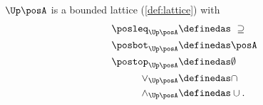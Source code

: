 \begin{lemma}
    \label{lem:u_bounded_lat}
    $\Up \posA$ is a bounded lattice (\cref{def:lattice}) with
    \begin{equation}
        \begin{aligned}
            \posleq_{\Up \posA} & \definedas \ \supseteq \\
            \posbot_{\Up \posA} & \definedas \posA       \\
            \postop_{\Up \posA} & \definedas \emptyset   \\
            \vee_{\Up \posA}    & \definedas \cap        \\
            \wedge_{\Up \posA}  & \definedas \cup.
        \end{aligned}
    \end{equation}
\end{lemma}
